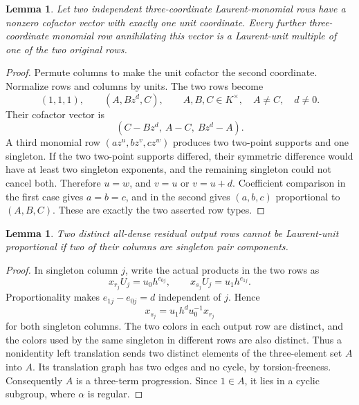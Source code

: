 \documentclass[11pt,a4paper,oneside]{report}
\newtheorem{lemma}[theorem]{Lemma}
\theoremstyle{definition}
\theoremstyle{remark}
\begin{document}
\begin{lemma}\label{M12:frontier:monomial-rows}
Let two independent three-coordinate Laurent-monomial rows have a
nonzero cofactor vector with exactly one unit coordinate. Every
further three-coordinate monomial row annihilating this vector is
a Laurent-unit multiple of one of the two original rows.
\end{lemma}
\begin{proof}
Permute columns to make the unit cofactor the second coordinate.
Normalize rows and columns by units. The two rows become
\[
 (1,1,1),\qquad (A,Bz^d,C),
 \qquad A,B,C\in K^\times,\quad A\ne C,\quad d\ne0.
\]
Their cofactor vector is
\[
 (C-Bz^d,\ A-C,\ Bz^d-A).
\]
A third monomial row $(az^u,bz^v,cz^w)$ produces two two-point
supports and one singleton. If the two two-point supports differed,
their symmetric difference would have at least two singleton
exponents, and the remaining singleton could not cancel both.
Therefore $u=w$, and $v=u$ or $v=u+d$. Coefficient comparison in
the first case gives $a=b=c$, and in the second gives
$(a,b,c)$ proportional to $(A,B,C)$. These are exactly the two
asserted row types.
\end{proof}

\begin{lemma}\label{M12:frontier:two-singletons}
Two distinct all-dense residual output rows cannot be Laurent-unit
proportional if two of their columns are singleton pair components.
\end{lemma}
\begin{proof}
In singleton column $j$, write the actual products in the two rows as
\[
 x_{r_j}U_j=u_0h^{e_{0j}},\qquad
 x_{s_j}U_j=u_1h^{e_{1j}}.
\]
Proportionality makes $e_{1j}-e_{0j}=d$ independent of $j$. Hence
\[
 x_{s_j}=u_1h^du_0^{-1}x_{r_j}
\]
for both singleton columns. The two colors in each output row are
distinct, and the colors used by the same singleton in different
rows are also distinct. Thus a nonidentity left translation sends
two distinct elements of the three-element set $A$ into $A$.
Its translation graph has two edges and no cycle, by torsion-freeness.
Consequently $A$ is a three-term progression. Since $1\in A$, it
lies in a cyclic subgroup, where $\alpha$ is regular.
\end{proof}
\end{document}
